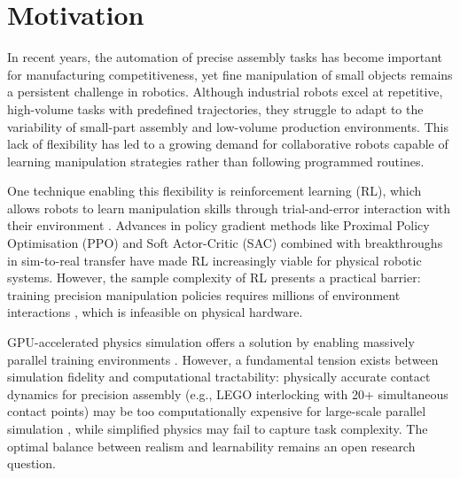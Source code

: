 \documentclass[12pt,a4paper,oneside]{report}
\begin{document}
\section{Motivation}

In recent years, the automation of precise assembly tasks has become important for manufacturing competitiveness, yet fine manipulation of small objects remains a persistent challenge in robotics\cite{TrendsChallengesRobot2019}. Although industrial robots excel at repetitive, high-volume tasks with predefined trajectories, they struggle to adapt to the variability of small-part assembly and low-volume production environments. This lack of flexibility has led to a growing demand for collaborative robots capable of learning manipulation strategies rather than following programmed routines.

One technique enabling this flexibility is reinforcement learning (RL), which allows robots to learn manipulation skills through trial-and-error interaction with their environment \cite{argallSurveyRobotLearning2009, campanaReinforcementLearningRoboticb}. Advances in policy gradient methods like Proximal Policy Optimisation (PPO) \cite{schulmanProximalPolicyOptimization2017} and Soft Actor-Critic (SAC) \cite{haarnojaSoftActorCriticOffPolicy2018b} combined with breakthroughs in sim-to-real transfer \cite{tobinDomainRandomizationTransferring2017a, wangOneshotSimtorealTransfer2024, chengZeroshotSimtorealTransfer2023} have made RL increasingly viable for physical robotic systems. However, the sample complexity of RL presents a practical barrier: training precision manipulation policies requires millions of environment interactions \cite{koberReinforcementLearningRoboticsc}, which is infeasible on physical hardware.

GPU-accelerated physics simulation offers a solution by enabling massively parallel training environments \cite{makoviychukIsaacGymHigh2021b, nvidiaIsaacLabUnified2024}. However, a fundamental tension exists between simulation fidelity and computational tractability: physically accurate contact dynamics for precision assembly (e.g., LEGO interlocking with 20+ simultaneous contact points) may be too computationally expensive for large-scale parallel simulation \cite{WelcomePhysXPhysX}, while simplified physics may fail to capture task complexity. The optimal balance between realism and learnability remains an open research question.
\end{document}

